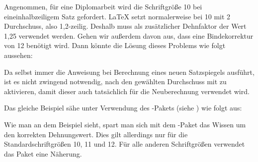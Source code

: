 \begin{Example}
  Angenommen, für eine Diplomarbeit wird die Schriftgröße
  10 bei eineinhalbzeiligem Satz \iffalse%
  zwingend \fi gefordert. {\LaTeX}
  setzt normalerweise bei 10 mit 2 Durchschuss,
  also 1,2-zeilig. Deshalb muss als zusätzlicher Dehnfaktor der Wert
  1,25 verwendet werden. Gehen wir außerdem davon aus, dass eine
  Bindekorrektur von 12 benötigt wird. Dann könnte die Lösung
  dieses Problems wie folgt aussehen:
  Da  selbst immer die Anweisung  bei
  Berechnung eines neuen Satzspiegels ausführt, ist es nicht zwingend
  notwendig, nach  den gewählten Durchschuss mit
   zu aktivieren, damit dieser %
\iftrue %
  auch tatsächlich 
\fi %
  für die Neuberechnung verwendet wird.

  Das gleiche Beispiel sähe unter Verwendung des
  -Pakets%
  (siehe \cite{package:setspace}) wie folgt aus:
\end{Example}

Wie man an dem Beispiel sieht, spart man sich mit dem
-Paket das Wissen um den korrekten Dehnungswert. Dies gilt
allerdings nur für die Standardschriftgrößen 10, 11 und
12. Für alle anderen Schriftgrößen verwendet das Paket 
%
\iffalse %
einen näherungsweise passenden Dehnungswert.
%
\else %
eine Näherung.
\fi

